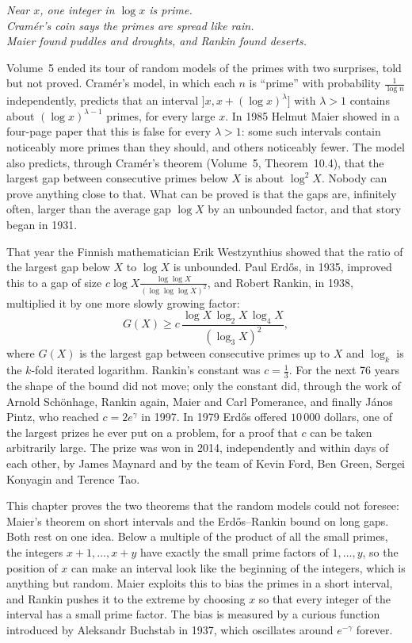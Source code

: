 \begin{center}\itshape
Near $x$, one integer in $\log x$ is prime.\\
Cramér's coin says the primes are spread like rain.\\
Maier found puddles and droughts, and Rankin found deserts.
\end{center}

Volume~5 ended its tour of random models of the primes with two surprises, told but not proved. Cramér's model, in which each $n$ is ``prime'' with probability $\frac1{\log n}$ independently, predicts that an interval $]x,x+(\log x)^\lambda]$ with $\lambda>1$ contains about $(\log x)^{\lambda-1}$ primes, for every large $x$. In 1985 Helmut Maier showed in a four-page paper that this is false for every $\lambda>1$: some such intervals contain noticeably more primes than they should, and others noticeably fewer. The model also predicts, through Cramér's theorem (Volume~5, Theorem~10.4), that the largest gap between consecutive primes below $X$ is about $\log^2X$. Nobody can prove anything close to that. What can be proved is that the gaps are, infinitely often, larger than the average gap $\log X$ by an unbounded factor, and that story began in 1931.

That year the Finnish mathematician Erik Westzynthius showed that the ratio of the largest gap below $X$ to $\log X$ is unbounded. Paul Erd\H{o}s, in 1935, improved this to a gap of size $c\log X\frac{\log\log X}{(\log\log\log X)^2}$, and Robert Rankin, in 1938, multiplied it by one more slowly growing factor:
\[
G(X)\ge c\,\frac{\log X\,\log_2X\,\log_4X}{(\log_3X)^2},
\]
where $G(X)$ is the largest gap between consecutive primes up to $X$ and $\log_k$ is the $k$-fold iterated logarithm. Rankin's constant was $c=\frac13$. For the next 76 years the shape of the bound did not move; only the constant did, through the work of Arnold Schönhage, Rankin again, Maier and Carl Pomerance, and finally János Pintz, who reached $c=2e^\gamma$ in 1997. In 1979 Erd\H{o}s offered $10\,000$ dollars, one of the largest prizes he ever put on a problem, for a proof that $c$ can be taken arbitrarily large. The prize was won in 2014, independently and within days of each other, by James Maynard and by the team of Kevin Ford, Ben Green, Sergei Konyagin and Terence Tao.

This chapter proves the two theorems that the random models could not foresee: Maier's theorem on short intervals and the Erd\H{o}s--Rankin bound on long gaps. Both rest on one idea. Below a multiple of the product of all the small primes, the integers $x+1,\dots,x+y$ have exactly the small prime factors of $1,\dots,y$, so the position of $x$ can make an interval look like the beginning of the integers, which is anything but random. Maier exploits this to bias the primes in a short interval, and Rankin pushes it to the extreme by choosing $x$ so that every integer of the interval has a small prime factor. The bias is measured by a curious function introduced by Aleksandr Buchstab in 1937, which oscillates around $e^{-\gamma}$ forever.

